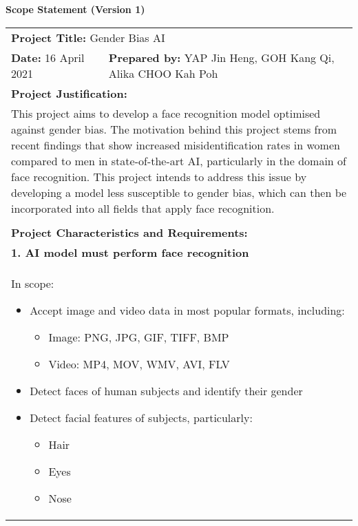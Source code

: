 \begin{center}
    \textbf{Scope Statement (Version 1)}
\end{center}

\begin{longtable}{ | p{} l | }
    \hline
    \multicolumn{2}{|l|}{\textbf{Project Title:} Gender Bias AI} \\
    \textbf{Date:} 16 April 2021 &
    \textbf{Prepared by:} YAP Jin Heng, GOH Kang Qi, Alika CHOO Kah Poh \\
    \hline
    \multicolumn{2}{|l|}{\textbf{Project Justification:}} \\
    \multicolumn{2}{|p{\textwidth}|}{This project aims to develop a face recognition model optimised against gender bias. The motivation behind this project stems from recent findings that show increased misidentification rates in women compared to men in state-of-the-art AI, particularly in the domain of face recognition. This project intends to address this issue by developing a model less susceptible to gender bias, which can then be incorporated into all fields that apply face recognition.} \\
    & \\
    \hline
    \multicolumn{2}{|p{\textwidth}|}{\textbf{Project Characteristics and Requirements:}} \\
    \multicolumn{2}{|p{\textwidth}|}{\textbf{1. AI model must perform face recognition}} \\
    \multicolumn{2}{|p{\textwidth}|}{\hspace{0.6cm}In scope:
        \begin{itemize}
            \item Accept image and video data in most popular formats, including:
                \begin{itemize}
                    \item Image: PNG, JPG, GIF, TIFF, BMP
                    \item Video: MP4, MOV, WMV, AVI, FLV
                \end{itemize}
            \item Detect faces of human subjects and identify their gender
            \item Detect facial features of subjects, particularly:
                \begin{itemize}
                    \item Hair
                    \item Eyes
                    \item Nose

\end{itemize}
\end{itemize}}
\end{longtable}
